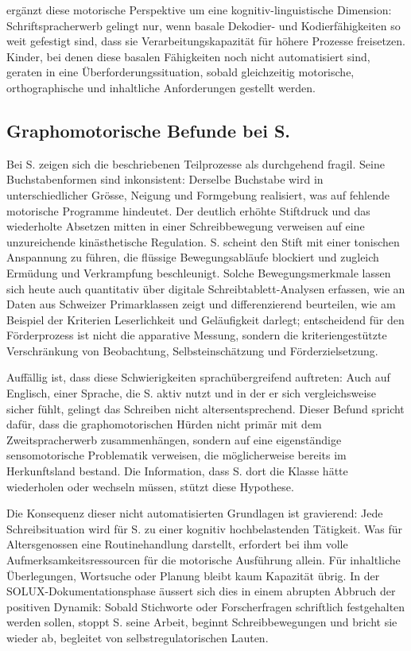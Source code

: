 \documentclass[ngerman, a4paper]{article}
\begin{document}
\textcite[Kap.\,1--4]{gold2018lesenkannmanlernen} ergänzt diese motorische Perspektive um eine kognitiv-linguistische Dimension:
Schriftspracherwerb gelingt nur, wenn basale Dekodier- und Kodierfähigkeiten so weit
gefestigt sind, dass sie Verarbeitungskapazität für höhere Prozesse freisetzen. Kinder,
bei denen diese basalen Fähigkeiten noch nicht automatisiert sind, geraten in eine
Überforderungssituation, sobald gleichzeitig motorische, orthographische und inhaltliche
Anforderungen gestellt werden.

\subsection{Graphomotorische Befunde bei S.}

Bei S. zeigen sich die beschriebenen Teilprozesse als durchgehend fragil. Seine
Buchstabenformen sind inkonsistent: Derselbe Buchstabe wird in unterschiedlicher Grösse,
Neigung und Formgebung realisiert, was auf fehlende motorische Programme hindeutet. Der
deutlich erhöhte Stiftdruck und das wiederholte Absetzen mitten in einer Schreibbewegung
verweisen auf eine unzureichende kinästhetische Regulation. S. scheint den Stift mit einer
tonischen Anspannung zu führen, die flüssige Bewegungsabläufe blockiert und zugleich
Ermüdung und Verkrampfung beschleunigt. Solche Bewegungsmerkmale lassen sich heute auch quantitativ über digitale
Schreibtablett-Analysen erfassen, wie
\textcite{hurschlerlichtsteiner2024handschriftanalysen} an Daten aus
Schweizer Primarklassen zeigt und differenzierend beurteilen, wie
\textcite[S.\,3,\,11]{hurschler2020handschriftbeurteilung} am Beispiel der
Kriterien Leserlichkeit und Geläufigkeit darlegt; entscheidend für den
Förderprozess ist nicht die apparative Messung, sondern die
kriteriengestützte Verschränkung von Beobachtung, Selbsteinschätzung und
Förderzielsetzung.

Auffällig ist, dass diese Schwierigkeiten sprachübergreifend auftreten: Auch auf Englisch,
einer Sprache, die S. aktiv nutzt und in der er sich vergleichsweise sicher fühlt,
gelingt das Schreiben nicht altersentsprechend. Dieser Befund spricht dafür, dass die
graphomotorischen Hürden nicht primär mit dem Zweitspracherwerb zusammenhängen,
sondern auf eine eigenständige sensomotorische Problematik verweisen, die möglicherweise
bereits im Herkunftsland bestand. Die Information, dass S. dort die Klasse hätte
wiederholen oder wechseln müssen, stützt diese Hypothese.

Die Konsequenz dieser nicht automatisierten Grundlagen ist gravierend: Jede
Schreibsituation wird für S. zu einer kognitiv hochbelastenden Tätigkeit. Was für
Altersgenossen eine Routinehandlung darstellt, erfordert bei ihm volle
Aufmerksamkeitsressourcen für die motorische Ausführung allein. Für inhaltliche
Überlegungen, Wortsuche oder Planung bleibt kaum Kapazität übrig. In der
SOLUX-Dokumentationsphase äussert sich dies in einem abrupten Abbruch der positiven
Dynamik: Sobald Stichworte oder Forscherfragen schriftlich festgehalten werden sollen,
stoppt S. seine Arbeit, beginnt Schreibbewegungen und bricht sie wieder ab, begleitet
von selbstregulatorischen Lauten.
\end{document}
